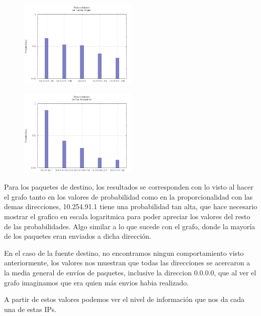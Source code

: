 \newpage

\begin{figure}[!ht]
    \centering
    \includegraphics[width=0.5\textwidth]{img/graph/escenario_3/proba_src.png}
\end{figure}


\begin{figure}[!ht]
    \centering
    \includegraphics[width=0.5\textwidth]{img/graph/escenario_3/proba_dst.png}
\end{figure}


	\par Para los paquetes de destino, los resultados se corresponden con lo visto al hacer el grafo tanto en los valores de probabilidad como en la proporcionalidad con las demas direcciones, 10.254.91.1 tiene una probabilidad tan alta, que hace necesario mostrar el grafico en escala logaritmica para poder apreciar los valores del resto de las probabilidades. Algo similar a lo que sucede con el grafo, donde la mayoría de los paquetes eran enviados a dicha dirección.
	\vspace{6 mm}

	\par En el caso de la fuente destino, no encontramos ningun comportamiento visto anteriormente, los valores nos muestran que todas las direcciones se acercaron a la media general de envíos de paquetes, inclusive la direccion 0.0.0.0, que al ver el grafo imaginamos que era quien más envios habia realizado. 


	\par A partir de estos valores podemos ver el nivel de información que nos da cada una de estas IPs.

